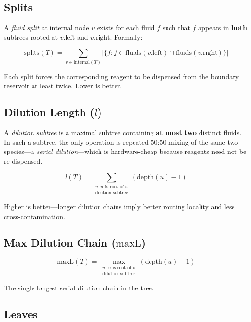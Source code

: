 \subsection{Splits}

A \textit{fluid split} at internal node $v$ exists for each fluid $f$ such that $f$ appears in \textbf{both} subtrees rooted at $v.\text{left}$ and $v.\text{right}$. Formally:

\begin{equation}
\text{splits}(T) = \sum_{v \in \text{internal}(T)} |\{ f : f \in \text{fluids}(v.\text{left}) \cap \text{fluids}(v.\text{right}) \}|
\end{equation}

Each split forces the corresponding reagent to be dispensed from the boundary reservoir at least twice. Lower is better.

\subsection{Dilution Length ($l$)}

A \textit{dilution subtree} is a maximal subtree containing \textbf{at most two} distinct fluids. In such a subtree, the only operation is repeated 50:50 mixing of the same two species---a \textit{serial dilution}---which is hardware-cheap because reagents need not be re-dispensed.

\begin{equation}
l(T) = \sum_{\substack{u:\, u \text{ is root of a} \\ \text{dilution subtree}}} (\text{depth}(u) - 1)
\end{equation}

Higher is better---longer dilution chains imply better routing locality and less cross-contamination.

\subsection{Max Dilution Chain ($\text{maxL}$)}

\begin{equation}
\text{maxL}(T) = \max_{\substack{u:\, u \text{ is root of a} \\ \text{dilution subtree}}} (\text{depth}(u) - 1)
\end{equation}

The single longest serial dilution chain in the tree.

\subsection{Leaves}

